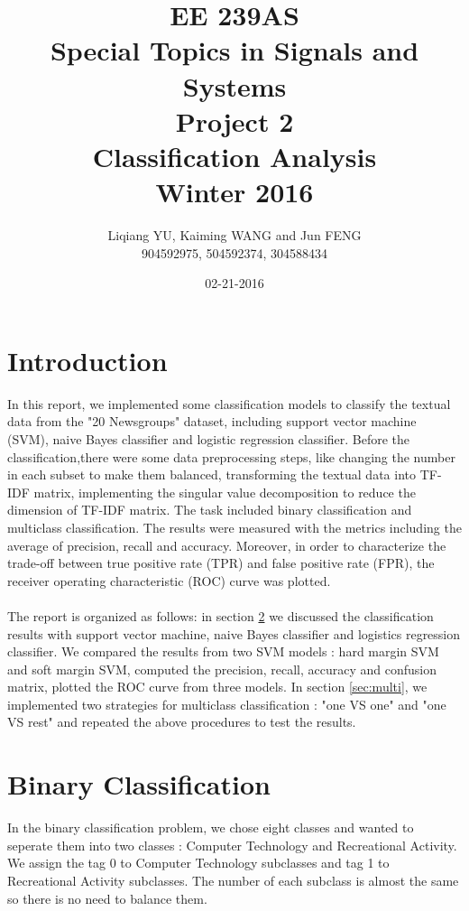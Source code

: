 \documentclass{article}
\begin{document}
\begin{titlepage}
\title{EE 239AS \\Special Topics in Signals and Systems\\Project 2\\Classification Analysis\\Winter 2016} 
\author{Liqiang YU, Kaiming WANG and Jun FENG\\
904592975, 504592374, 304588434} 
\date{02-21-2016}
\end{titlepage}

\maketitle
\newpage
\tableofcontents
\newpage
\section{Introduction}
In this report, we implemented some classification models to classify the textual data from the "20 Newsgroups" dataset, including support vector machine (SVM), naive Bayes classifier and logistic regression classifier. Before the classification,there were some data preprocessing steps, like changing the number in each subset to make them balanced, transforming the textual data into TF-IDF matrix, implementing the singular value decomposition to reduce the dimension of TF-IDF matrix. The task included binary classification and multiclass classification. The results were measured with the metrics including the average of precision, recall and accuracy. Moreover, in order to characterize the trade-off between true positive rate (TPR) and false positive rate (FPR), the receiver operating characteristic (ROC) curve was plotted.\\
\\
The report is organized as follows: in section \ref{sec:binary} we discussed the classification results with support vector machine, naive Bayes classifier and logistics regression classifier. We compared the results from two SVM models : hard margin SVM and soft margin SVM, computed the precision, recall, accuracy and confusion matrix, plotted the ROC curve from three models. In section \ref{sec:multi}, we implemented two strategies for multiclass classification : "one VS one" and "one VS rest" and repeated the above procedures to test the results.
\section{Binary Classification}\label{sec:binary}
In the binary classification problem, we chose eight classes and wanted to seperate them into two classes : Computer Technology and Recreational Activity. We assign the tag 0 to Computer Technology subclasses and tag 1 to Recreational Activity subclasses. The number of each subclass is almost the same so there is no need to balance them.
\end{document}
